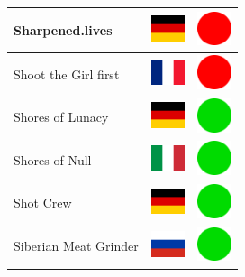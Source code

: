 \documentclass[12pt, a4paper, twoside]{report}
\begin{document}
\begin{center}
\begin{longtable}{|p{5cm}|p{2cm}|p{2cm}|}
 Sharpened.lives                                            & \includegraphics[width=1cm]{../img/flags/de} &   \includegraphics[width=1cm]{../likes/n} \\ \hline
 Shoot the Girl first                                       & \includegraphics[width=1cm]{../img/flags/fr} &   \includegraphics[width=1cm]{../likes/n} \\ \hline
 Shores of Lunacy                                           & \includegraphics[width=1cm]{../img/flags/de} &   \includegraphics[width=1cm]{../likes/y} \\ \hline
 Shores of Null                                             & \includegraphics[width=1cm]{../img/flags/it} &   \includegraphics[width=1cm]{../likes/y} \\ \hline
 Shot Crew                                                  & \includegraphics[width=1cm]{../img/flags/de} &   \includegraphics[width=1cm]{../likes/y} \\ \hline
 Siberian Meat Grinder                                      & \includegraphics[width=1cm]{../img/flags/ru} &   \includegraphics[width=1cm]{../likes/y} \\ \hline

\end{longtable}
\end{center}
\end{document}
